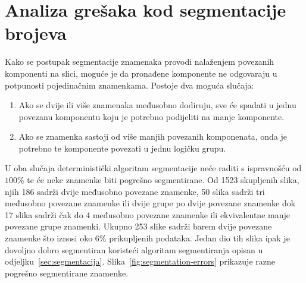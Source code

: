 \section{Analiza grešaka kod segmentacije brojeva}
Kako se postupak segmentacije znamenaka provodi nalaženjem povezanih komponenti na slici, moguće je da pronađene
komponente ne odgovaraju u potpunosti pojedinačnim znamenkama. Postoje dva moguća slučaja:
\begin{enumerate}
    \item Ako se dvije ili više znamenaka međusobno dodiruju, sve će spadati u jednu povezanu komponentu koju je
    potrebno podijeliti na manje komponente.
    \item Ako se znamenka sastoji od više manjih povezanih komponenata, onda je potrebno te komponente povezati u jednu
    logičku grupu.
\end{enumerate}
U oba slučaja deterministički algoritam segmentacije neće raditi s  ispravnošću od $100\%$ te će neke znamenke biti
pogrešno segmentirane. Od 1523 skupljenih slika, njih 186 sadrži dvije međusobno povezane znamenke, 50 slika sadrži tri
međusobno povezane znamenke ili dvije grupe po dvije povezane znamenke dok 17 slika sadrži čak do 4 međusobno povezane
znamenke ili ekvivalentne manje povezane grupe znamenki. Ukupno 253 slike sadrži barem dvije povezane znamenke što
iznosi oko $6\%$ prikupljenih podataka. Jedan dio tih slika ipak je dovoljno dobro segmentiran koristeći algoritam
segmentiranja opisan u odjeljku\ \ref{sec:segmentacija}. Slika\ \ref{fig:segmentation-errors} prikazuje razne pogrešno
segmentirane znamenke.
